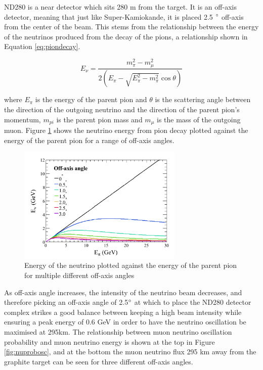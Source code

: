 ND280 is a near detector which sits 280 m from the target. It is an off-axis detector, meaning that just like Super-Kamiokande, it is placed 2.5 $\degree$ off-axis from the center of the beam. This stems from the relationship between the energy of the neutrinos produced from the decay of the pions, a relationship shown in Equation \ref{eq:piondecay}. 

\begin{equation}
    E_{\nu}=\frac{m_{\pi}^{2}-m_{\mu}^{2}}{2\left(E_{\pi}-\sqrt{E_{\pi}^{2}-m_{\pi}^{2}} \cos \theta\right)}
\label{eq:piondecay}
\end{equation}

where $E_{\pi}$ is the energy of the parent pion and $\theta$ is the scattering angle between the direction of the outgoing neutrino and the direction of the parent pion's momentum, $m_{pi}$ is the parent pion mass and $m_{\mu}$ is the mass of the outgoing muon. Figure \ref{fig:energyangle} shows the neutrino energy from pion decay plotted against the energy of the parent pion for a range of off-axis angles. 

\begin{figure}
\centering
\includegraphics[width=0.7\textwidth]{Figures/energy_angle.PNG}
\caption{Energy of the neutrino plotted against the energy of the parent pion for multiple different off-axis angles}
\label{fig:energyangle}
\end{figure}

As off-axis angle increases, the intensity of the neutrino beam decreases, and therefore picking an off-axis angle of 2.5$\degree$ at which to place the ND280 detector complex strikes a good balance between keeping a high beam intensity while ensuring a peak energy of 0.6 GeV in order to have the neutrino oscillation be maximised at 295km. The relationship between muon neutrino oscillation probability and muon neutrino energy is shown at the top in Figure \ref{fig:nuprobosc}, and at the bottom the muon neutrino flux 295 km away from the graphite target can be seen for three different off-axis angles.

